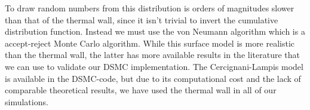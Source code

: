 To draw random numbers from this distribution is orders of magnitudes slower than that of the thermal wall, since it isn't trivial to invert the cumulative distribution function. Instead we must use the von Neumann algorithm which is a accept-reject Monte Carlo algorithm\cite{allen1989computer}. While this surface model is more realistic than the thermal wall, the latter has more available results in the literature that we can use to validate our DSMC implementation. The Cercignani-Lampis model is available in the DSMC-code, but due to its computational cost and the lack of comparable theoretical results, we have used the thermal wall in all of our simulations. 